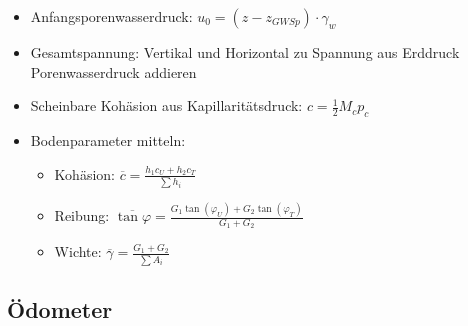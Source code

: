 \documentclass[fleqn,twoside]{article}
\begin{document}
\begin{itemize}
	\item Anfangsporenwasserdruck: $u_0 = (z-z_{GWSp}) \cdot \gamma_w$
	\item Gesamtspannung: Vertikal und Horizontal zu Spannung aus Erddruck Porenwasserdruck addieren
	\item Scheinbare Kohäsion aus Kapillaritätsdruck: $c = \frac{1}{2} M_c p_c$
	\item Bodenparameter mitteln:
	\begin{itemize}
		\item Kohäsion: $\overline{c} = \frac{h_1 c_U + h_2 c_T}{\sum h_i}$
		\item Reibung: $\overline{\tan \varphi} = \frac{G_1 \tan(\varphi_U) + G_2 \tan(\varphi_T)}{G_1 + G_2}$
		\item Wichte: $\overline{\gamma} = \frac{G_1 + G_2}{\sum A_i}$
	\end{itemize}
\end{itemize}

\subsection{Ödometer}
\end{document}
